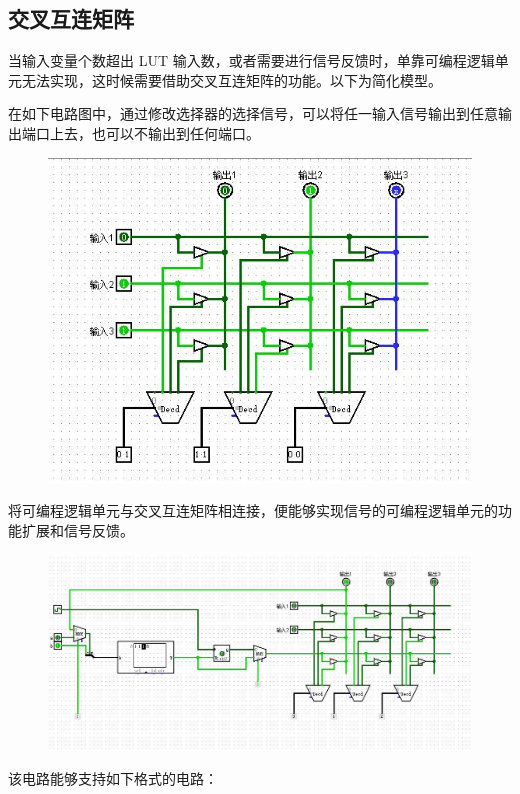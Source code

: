 \documentclass[UTF8]{article}
\begin{document}
	\subsection{交叉互连矩阵}
	当输入变量个数超出 LUT 输入数，或者需要进行信号反馈时，单靠可编程逻辑单元无法实现，这时候需要借助交叉互连矩阵的功能。以下为简化模型。\par
	在如下电路图中，通过修改选择器的选择信号，可以将任一输入信号输出到任意输出端口上去，也可以不输出到任何端口。\par
	\begin{figure}[H]
		\centering
		\includegraphics[width=1\linewidth]{s4.jpg}
		\label{s4}
	\end{figure}
	将可编程逻辑单元与交叉互连矩阵相连接，便能够实现信号的可编程逻辑单元的功能扩展和信号反馈。\par
	\begin{figure}[H]
		\centering
		\includegraphics[width=1\linewidth]{s4_2.jpg}
		\label{s4_2}
	\end{figure}
	该电路能够支持如下格式的电路：\par
\end{document}
